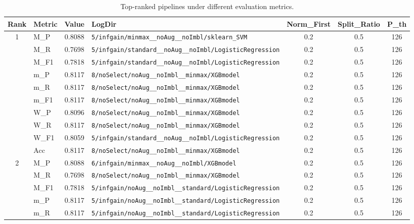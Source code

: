 \begin{table}[htbp]
\caption{Top-ranked pipelines under different evaluation metrics.}
\label{tab:rank_metric_vertical}
\centering
\small
\setlength{\tabcolsep}{4pt}
\begin{tabular}{|c|l|c|>{\ttfamily\footnotesize}p{7.2cm}|c|c|c|}
\hline
Rank & Metric & Value & LogDir & Norm\_First & Split\_Ratio & P\_th \\
\hline
\multirow{10}{*}{1} & M\_P & 0.8088 & \texttt{5/infgain/minmax\_\_noAug\_\_noImbl/sklearn\_SVM} & 0.2 & 0.5  & 126 \\ 
 & M\_R & 0.7698 & \texttt{5/infgain/standard\_\_noAug\_\_noImbl/LogisticRegression} & 0.2 & 0.5  & 126 \\ 
 & M\_F1 & 0.7818 & \texttt{5/infgain/standard\_\_noAug\_\_noImbl/LogisticRegression} & 0.2 & 0.5  & 126 \\ 
 & m\_P & 0.8117 & \texttt{8/noSelect/noAug\_\_noImbl\_\_minmax/XGBmodel} & 0.2 & 0.5  & 126 \\ 
 & m\_R & 0.8117 & \texttt{8/noSelect/noAug\_\_noImbl\_\_minmax/XGBmodel} & 0.2 & 0.5  & 126 \\ 
 & m\_F1 & 0.8117 & \texttt{8/noSelect/noAug\_\_noImbl\_\_minmax/XGBmodel} & 0.2 & 0.5  & 126 \\ 
 & W\_P & 0.8096 & \texttt{8/noSelect/noAug\_\_noImbl\_\_minmax/XGBmodel} & 0.2 & 0.5  & 126 \\ 
 & W\_R & 0.8117 & \texttt{8/noSelect/noAug\_\_noImbl\_\_minmax/XGBmodel} & 0.2 & 0.5  & 126 \\ 
 & W\_F1 & 0.8059 & \texttt{5/infgain/standard\_\_noAug\_\_noImbl/LogisticRegression} & 0.2 & 0.5  & 126 \\ 
 & Acc & 0.8117 & \texttt{8/noSelect/noAug\_\_noImbl\_\_minmax/XGBmodel} & 0.2 & 0.5  & 126 \\ 
\hline
\multirow{10}{*}{2} & M\_P & 0.8088 & \texttt{6/infgain/minmax\_\_noAug\_\_noImbl/XGBmodel} & 0.2 & 0.5  & 126 \\ 
 & M\_R & 0.7698 & \texttt{8/noSelect/noAug\_\_noImbl\_\_minmax/XGBmodel} & 0.2 & 0.5  & 126 \\ 
 & M\_F1 & 0.7818 & \texttt{5/infgain/noAug\_\_noImbl\_\_standard/LogisticRegression} & 0.2 & 0.5  & 126 \\ 
 & m\_P & 0.8117 & \texttt{5/infgain/noAug\_\_noImbl\_\_standard/LogisticRegression} & 0.2 & 0.5  & 126 \\ 
 & m\_R & 0.8117 & \texttt{5/infgain/noAug\_\_noImbl\_\_standard/LogisticRegression} & 0.2 & 0.5  & 126 \\ 

\end{tabular}
\end{table}
